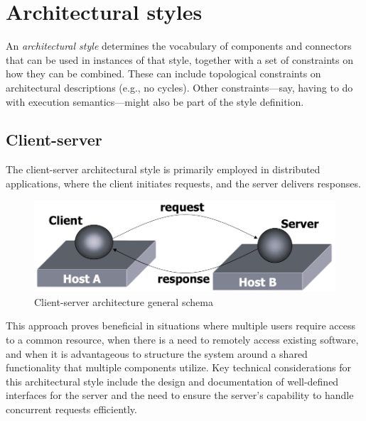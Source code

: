 \section{Architectural styles}  

\begin{definition}
    An \emph{architectural style} determines the vocabulary of components and connectors that can be used in instances of that style, together with a set of constraints on how they can be combined.
    These can include topological constraints on architectural descriptions (e.g., no cycles). 
    Other constraints—say, having to do with execution semantics—might also be part of the style definition.
\end{definition}

\subsection*{Client-server}
The client-server architectural style is primarily employed in distributed applications, where the client initiates requests, and the server delivers responses.
\begin{figure}[H]
    \centering
    \includegraphics[width=0.5\linewidth]{images/clientserver.png}
    \caption{Client-server architecture general schema}
\end{figure}
This approach proves beneficial in situations where multiple users require access to a common resource, when there is a need to remotely access existing software, and when it is advantageous to structure the system around a shared functionality that multiple components utilize.
Key technical considerations for this architectural style include the design and documentation of well-defined interfaces for the server and the need to ensure the server's capability to handle concurrent requests efficiently.

